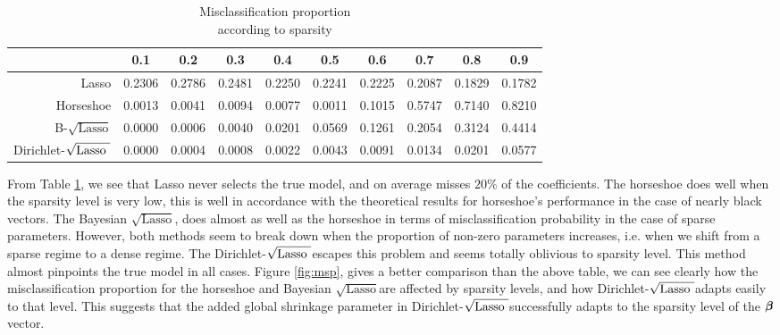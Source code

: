 \documentclass[ba]{imsart}
\def\sql{$\sqrt{\text{Lasso}}$}
\def\sqdl{Dirichlet-$\sqrt{\text{\rm{Lasso} }}$}
\begin{document}
\begin{table}[h!]
\caption{Misclassification proportion \\ according to sparsity}\label{table:msp}
\begin{center}
\footnotesize{
\begin{tabular}{c|c|c|c|c|c|c|c|c|c|}
\cline{2-10}
    & 0.1  &  0.2  &  0.3  &  0.4  &  0.5 &   0.6  &  0.7  &  0.8 &   0.9 	\\
\hline
\multicolumn{1}{|r|}{Lasso} &  0.2306 & 0.2786 & 0.2481 & 0.2250 & 0.2241 & 0.2225 & 0.2087 & 0.1829 & 0.1782	\\
\hline
\multicolumn{1}{|r|}{Horseshoe} &  0.0013 & 0.0041 & 0.0094 & 0.0077 & 0.0011 & 0.1015 & 0.5747 & 0.7140 & 0.8210\\
\hline
\multicolumn{1}{|r|}{B-\sql} & 0.0000 & 0.0006 & 0.0040 & 0.0201 & 0.0569 & 0.1261 & 0.2054 & 0.3124 & 0.4414 \\
\hline
\multicolumn{1}{|r|}{\sqdl} & 0.0000 & 0.0004 & 0.0008 & 0.0022 & 0.0043 & 0.0091 & 0.0134 & 0.0201 & 0.0577 \\
\hline
\end{tabular}}
\end{center}

\end{table}

From Table \ref{table:msp}, we see that Lasso never selects the true model, and on average misses $20 \% $ of the coefficients. The horseshoe does well when the sparsity  level is very low, this is well in accordance with the theoretical results for horseshoe's performance in the case of nearly black vectors. The Bayesian \sql, does almost as well as the horseshoe in terms of misclassification probability in the case of sparse parameters. However, both methods seem to break down when the proportion of non-zero parameters increases, i.e. when we shift from a sparse regime to a dense regime. The \sqdl escapes this problem and seems totally oblivious to sparsity level. This method almost pinpoints the true model in all cases. Figure \ref{fig:msp}, gives a better comparison than the above table, we can see clearly how the misclassification proportion for the horseshoe and Bayesian \sql are affected by sparsity levels, and how \sqdl adapts easily to that level. This suggests that the added global shrinkage parameter in \sqdl  successfully adapts to the sparsity level of the $\boldsymbol{\beta}$ vector. 
\end{document}
